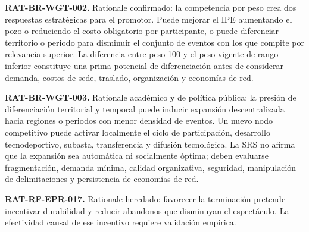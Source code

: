 \documentclass[10pt,letterpaper]{article}
\begin{document}
\noindent\textbf{RAT-BR-WGT-002.} Rationale confirmado: la competencia por peso crea dos respuestas estratégicas para el promotor. Puede mejorar el IPE aumentando el pozo o reduciendo el costo obligatorio por participante, o puede diferenciar territorio o periodo para disminuir el conjunto de eventos con los que compite por relevancia superior. La diferencia entre peso 100 y el peso vigente de rango inferior constituye una prima potencial de diferenciación antes de considerar demanda, costos de sede, traslado, organización y economías de red.\par
\noindent\textbf{RAT-BR-WGT-003.} Rationale académico y de política pública: la presión de diferenciación territorial y temporal puede inducir expansión descentralizada hacia regiones o periodos con menor densidad de eventos. Un nuevo nodo competitivo puede activar localmente el ciclo de participación, desarrollo tecnodeportivo, subasta, transferencia y difusión tecnológica. La SRS no afirma que la expansión sea automática ni socialmente óptima; deben evaluarse fragmentación, demanda mínima, calidad organizativa, seguridad, manipulación de delimitaciones y persistencia de economías de red.\par
\noindent\textbf{RAT-RF-EPR-017.} Rationale heredado: favorecer la terminación pretende incentivar durabilidad y reducir abandonos que disminuyan el espectáculo. La efectividad causal de ese incentivo requiere validación empírica.\par
\end{document}
